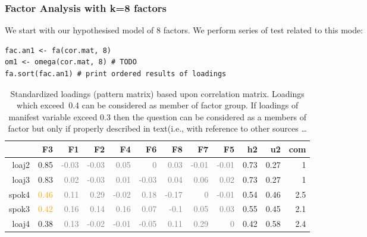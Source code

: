 \documentclass[10pt,a4paper]{article}
\begin{document}
\subsubsection{Factor Analysis with k=8 factors}
We start with our hypothesised model of 8 factors. We perform series of test related to this mode:
\begin{lstlisting}
fac.an1 <- fa(cor.mat, 8) 
om1 <- omega(cor.mat, 8) # TODO
fa.sort(fac.an1) # print ordered results of loadings
\end{lstlisting}



\begin{table}[htbp]
  \centering
  \caption{Standardized loadings (pattern matrix) based upon correlation matrix. Loadings which exceed~0.4 can be considered as member of factor group. If loadings of manifest variable exceed 0.3 then the question can be considered as a members of factor but only if properly described in text(i.e., with reference to other sources \dots}
    \begin{tabular}{r|rrrrrrrr|rrr}
        & F3 & F1 & F2 & F4 & F6 & F8 & F7 & F5 & h2  & u2  & com \\\hline
    loaj2 & \textcolor{NavyBlue}{0.85} & \textcolor{Gray}{-0.03} & \textcolor{Gray}{-0.03} & \textcolor{Gray}{0.05} & \textcolor{Gray}{0   } & \textcolor{Gray}{0.03} & \textcolor{Gray}{-0.01} & \textcolor{Gray}{-0.01} & 0.73 & 0.27 & 1 \\
    loaj3 & \textcolor{NavyBlue}{0.83} & \textcolor{Gray}{0.02} & \textcolor{Gray}{-0.03} & \textcolor{Gray}{0.01} & \textcolor{Gray}{-0.03} & \textcolor{Gray}{0.04} & \textcolor{Gray}{0.06} & \textcolor{Gray}{0.02} & 0.73 & 0.27 & 1 \\
    spok4 & \textcolor{Orange}{0.46} & \textcolor{Gray}{0.11} & \textcolor{Gray}{0.29} & \textcolor{Gray}{-0.02} & \textcolor{Gray}{0.18} & \textcolor{Gray}{-0.17} & \textcolor{Gray}{0   } & \textcolor{Gray}{-0.01} & 0.54 & 0.46 & 2.5 \\
    spok3 & \textcolor{Orange}{0.42} & \textcolor{Gray}{0.16} & \textcolor{Gray}{0.14} & \textcolor{Gray}{0.16} & \textcolor{Gray}{0.07} & \textcolor{Gray}{-0.1} & \textcolor{Gray}{0.05} & \textcolor{Gray}{0.03} & 0.55 & 0.45 & 2.1 \\
    loaj4 & \textcolor{NavyBlue}{0.38} & \textcolor{Gray}{0.13} & \textcolor{Gray}{-0.02} & \textcolor{Gray}{-0.01} & \textcolor{Gray}{-0.05} & \textcolor{Gray}{0.11} & \textcolor{Gray}{0.29} & \textcolor{Gray}{0   } & 0.42 & 0.58 & 2.4 \\

\end{tabular}
\end{table}
\end{document}

